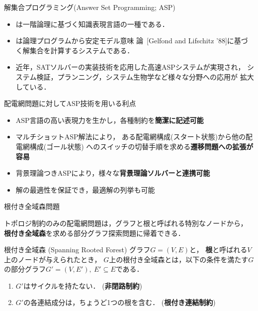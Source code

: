 \documentclass[dvipdfmx,11pt]{beamer}
\begin{document}
\begin{frame}{解集合プログラミング(Answer Set Programming; ASP)}
  \begin{itemize}
  \item {}は一階論理に基づく知識表現言語の一種である．
  \item {}は論理プログラムから安定モデル意味
    論~[Gelfond and Lifschitz '88]に基づく解集合を計算するシステムである．
  \item 近年，SATソルバーの実装技術を応用した高速ASPシステムが実現され，
    システム検証，プランニング，システム生物学など様々な分野への応用が
    拡大している．
  \end{itemize}
  \vfill
  \begin{alertblock}{配電網問題に対してASP技術を用いる利点}
    \begin{itemize}
    \item ASP言語の高い表現力を生かし，各種制約を\textbf{簡潔に記述可能}
    \item マルチショットASP解法により，
      ある配電網構成(スタート状態)から他の配電網構成(ゴール状態)
      へのスイッチの切替手順を求める\textbf{遷移問題への拡張が容易}
    \item 背景理論つきASPにより，様々な\textbf{背景理論ソルバーと連携可能}
    \item 解の最適性を保証でき，最適解の列挙も可能
    \end{itemize}
  \end{alertblock}
\end{frame}
\begin{frame}{根付き全域森問題}
  \begin{alertblock}{}
    トポロジ制約のみの配電網問題は，グラフと根と呼ばれる特別なノードから，
    \alert{\bf 根付き全域森}を求める部分グラフ探索問題に帰着できる．
  \end{alertblock}
  \vfill
  \begin{block}{根付き全域森 (Spanning Rooted Forest)}
    グラフ$G=(V,E)$と，
    \textbf{根}と呼ばれる$V$上のノードが与えられたとき，
    $G$上の根付き全域森とは，以下の条件を満たす$G$の部分グラフ$G'=(V,E'),\ E' \subseteq E$である．
    \begin{enumerate}
    \item $G'$はサイクルを持たない． (\alert{\bf 非閉路制約})
    \item $G'$の各連結成分は，ちょうど1つの根を含む． (\alert{\bf 根付き連結制約})
    \end{enumerate}
  \end{block}
\end{frame}
\end{document}
